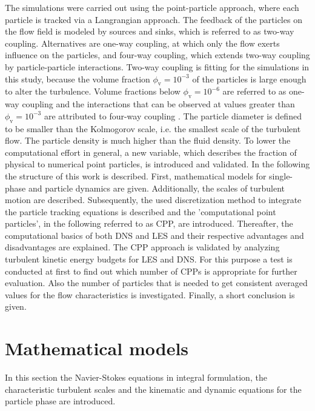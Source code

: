 \documentclass[11pt,a4paper,openany,oneside,parskip=half*]{article}
\begin{document}
\newline
The simulations were carried out using the point-particle approach, where each particle is tracked via a Langrangian approach. The feedback of the particles on the flow field is modeled by sources and sinks, which is referred to as two-way coupling. Alternatives are one-way coupling, at which only the flow exerts influence on the particles, and four-way coupling, which extends two-way coupling by particle-particle interactions. Two-way coupling is fitting for the simulations in this study, because the volume fraction $\phi_\mathrm{v}= 10^{-3}$ of the particles is large enough to alter the turbulence. Volume fractions below $\phi_\mathrm{v}= 10^{-6}$ are referred to as one-way coupling and the interactions that can be observed at values greater than $\phi_\mathrm{v}= 10^{-3}$ are attributed to four-way coupling \cite{particleladenTurbulentFlows:DirectSimulationAndClosureModels}\cite{OnPredictingParticle-LadenTurbulentFlows}.
The particle diameter is defined to be smaller than the Kolmogorov scale, i.e. the smallest scale of the turbulent flow. The particle density is much higher than the fluid density.
\newline
To lower the computational effort in general, a new variable, which describes the fraction of physical to numerical point particles, is introduced and validated.
\newline
In the following the structure of this work is described. 
First, mathematical models for single-phase and particle dynamics are given. 
Additionally, the scales of turbulent motion are described.
Subsequently, the used discretization method to integrate the particle tracking equations is described and the 'computational point particles', in the following referred to as CPP, are introduced.
Thereafter, the computational basics of both DNS and LES and their respective advantages and disadvantages are explained. 
The CPP approach is validated by analyzing turbulent kinetic energy budgets for LES and DNS. For this purpose a test is conducted at first to find out which number of CPPs is appropriate for further evaluation.
Also the number of particles that is needed to get consistent averaged values for the flow characteristics is investigated.
Finally, a short conclusion is given.
\pagebreak
\section{Mathematical models}
In this section the Navier-Stokes equations in integral formulation, the characteristic turbulent scales and the kinematic and dynamic equations for the particle phase are introduced.
\newline
\end{document}
